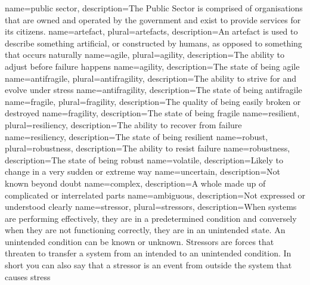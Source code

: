 {
	name={public sector},
	description={The Public Sector is comprised of organisations that are owned and operated by the government and exist to provide services for its citizens.}
}
{
	name={artefact},
	plural={artefacts},
	description={An artefact is used to describe something artificial, or constructed by humans, as opposed to something that occurs naturally}
}
{
	name=agile,
	plural={agility},
	description={The ability to adjust before failure happens}
}
{
	name={agility},
	description={The state of being agile}
}
{
	name={antifragile},
	plural={antifragility},
	description={The ability to strive for and evolve under stress}
}
{
	name={antifragility},
	description={The state of being antifragile}
}
{
	name=fragile,
	plural={fragility},
	description={The quality of being easily broken or destroyed}
}
{
	name={fragility},
	description={The state of being fragile}
}
{
	name=resilient,
	plural={resiliency},
	description={The ability to recover from failure}
}
{
	name={resiliency},
	description={The state of being resilient}
}
{
	name=robust,
	plural={robustness},
	description={The ability to resist failure}
}
{
	name={robustness},
	description={The state of being robust}
}
{
	name={volatile},
	description={Likely to change in a very sudden or extreme way}
}
{
	name=uncertain,
	description={Not known beyond doubt}
}
{
	name=complex,
	description={A whole made up of complicated or interrelated parts}
}
{
	name=ambiguous,
	description={Not expressed or understood clearly}
}
{
	name={stressor},
	plural={stressors},
	description={When systems are performing effectively, they are in a predetermined condition and conversely when they are not functioning correctly, they are in an unintended state. An unintended condition can be known or unknown. Stressors are forces that threaten to transfer a system from an intended to an unintended condition. In short you can also say that a stressor is an event from outside the system that causes stress}
}
